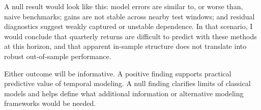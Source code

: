 \documentclass[11pt]{article}
\begin{document}
A null result would look like this: model errors are similar to, or worse than, naive benchmarks; gains are not stable across nearby test windows; and residual diagnostics suggest weakly captured or unstable dependence. In that scenario, I would conclude that quarterly returns are difficult to predict with these methods at this horizon, and that apparent in-sample structure does not translate into robust out-of-sample performance.

Either outcome will be informative. A positive finding supports practical predictive value of temporal modeling. A null finding clarifies limits of classical models and helps define what additional information or alternative modeling frameworks would be needed.
\end{document}
